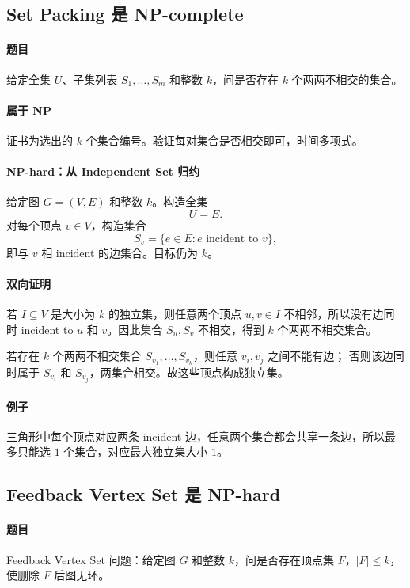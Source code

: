 \documentclass[UTF8,openany,12pt]{ctexbook}
\theoremstyle{remark}
\begin{document}
\subsection{Set Packing 是 NP-complete}

\paragraph{题目}
给定全集 $U$、子集列表 $S_1,\dots,S_m$ 和整数 $k$，问是否存在 $k$ 个两两不相交的集合。

\paragraph{属于 NP}
证书为选出的 $k$ 个集合编号。验证每对集合是否相交即可，时间多项式。

\paragraph{NP-hard：从 Independent Set 归约}
给定图 $G=(V,E)$ 和整数 $k$。构造全集
\[
  U=E.
\]
对每个顶点 $v\in V$，构造集合
\[
  S_v=\{e\in E: e\text{ incident to }v\},
\]
即与 $v$ 相 incident 的边集合。目标仍为 $k$。

\paragraph{双向证明}
若 $I\subseteq V$ 是大小为 $k$ 的独立集，则任意两个顶点 $u,v\in I$ 不相邻，所以没有边同时 incident to $u$ 和 $v$。因此集合 $S_u,S_v$ 不相交，得到 $k$ 个两两不相交集合。

若存在 $k$ 个两两不相交集合 $S_{v_1},\dots,S_{v_k}$，则任意 $v_i,v_j$ 之间不能有边；
否则该边同时属于 $S_{v_i}$ 和 $S_{v_j}$，两集合相交。故这些顶点构成独立集。

\paragraph{例子}
三角形中每个顶点对应两条 incident 边，任意两个集合都会共享一条边，所以最多只能选
$1$ 个集合，对应最大独立集大小 $1$。

\subsection{Feedback Vertex Set 是 NP-hard}

\paragraph{题目}
Feedback Vertex Set 问题：给定图 $G$ 和整数 $k$，问是否存在顶点集 $F$，$|F|\le k$，
使删除 $F$ 后图无环。
\end{document}
